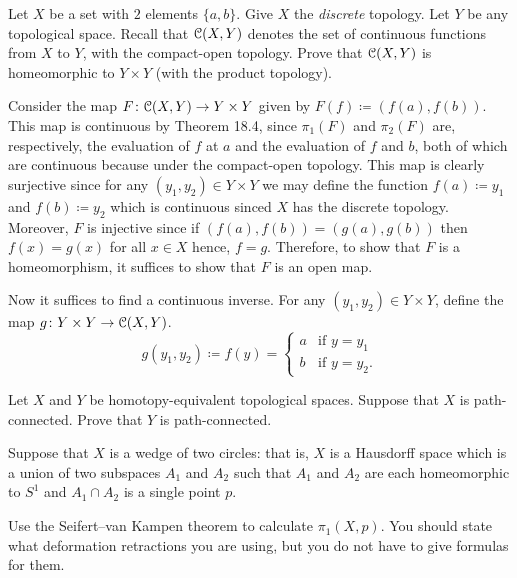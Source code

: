 \begin{problem}
Let $X$ be a set with $2$ elements $\{a,b\}$. Give $X$ the \emph{discrete}
topology. Let $Y$ be any topological space. Recall that $\mathcal{C}(X,Y)$
denotes the set of continuous functions from $X$ to $Y$, with the
compact-open topology. Prove that $\mathcal{C}(X,Y)$ is homeomorphic to $Y\times
Y$ (with the product topology).
\end{problem}
\begin{solution}
Consider the map $F\colon\mathcal{C}(X,Y)\to Y\times Y$ given by
$F(f)\coloneq(f(a),f(b))$. This map is continuous by Theorem 18.4, since
$\pi_1(F)$ and $\pi_2(F)$ are, respectively, the evaluation of $f$ at $a$
and the evaluation of $f$ and $b$, both of which are continuous because
under the compact-open topology. This map is clearly surjective since for
any $(y_1,y_2)\in Y\times Y$ we may define the function $f(a)\coloneq y_1$
and $f(b)\coloneq y_2$ which is continuous sinced $X$ has the discrete
topology. Moreover, $F$ is injective since if $(f(a),f(b))=(g(a),g(b))$
then $f(x)=g(x)$ for all $x\in X$ hence, $f=g$. Therefore, to show that $F$
is a homeomorphism, it suffices to show that $F$ is an open map.

Now it suffices to find a continuous inverse. For any $(y_1,y_2)\in Y\times
Y$, define the map $g\colon Y\times Y\to\mathcal{C}(X,Y)$.
\[
g(y_1,y_2)\coloneq f
(y)=\begin{cases}
a&\text{if $y=y_1$}\\
b&\text{if $y=y_2$}.
\end{cases}
\]

\end{solution}

\begin{problem}
Let $X$ and $Y$ be homotopy-equivalent topological spaces. Suppose that $X$
is path-connected. Prove that $Y$ is path-connected.
\end{problem}
\begin{solution}
\end{solution}

\begin{problem}
Suppose that $X$ is a wedge of two circles: that is, $X$ is a Hausdorff
space which is a union of two subspaces $A_1$ and $A_2$ such that $A_1$ and
$A_2$ are each homeomorphic to $S^1$ and $A_1\cap A_2$ is a single point $p$.

Use the Seifert--van Kampen theorem to calculate $\pi_1(X,p)$. You should
state what deformation retractions you are using, but you do not have to
give formulas for them.
\end{problem}
\begin{solution}
\end{solution}

